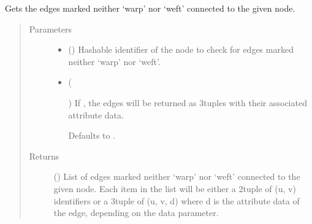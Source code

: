 \documentclass[letterpaper,10pt,english]{sphinxmanual}
\begin{document}
\begin{fulllineitems}
\begin{fulllineitems}
\label{\detokenize{cockatoo:cockatoo.KnitNetworkBase.node_contour_edges}}
Gets the edges marked neither ‘warp’ nor ‘weft’ connected to the
given node.
\begin{quote}\begin{description}
\item[{Parameters}] \leavevmode\begin{itemize}
\item {} 
 () \textendash{} Hashable identifier of the node to check for edges marked neither
‘warp’ nor ‘weft’.

\item {} 
 (%
\begin{footnote}[90]\sphinxAtStartFootnote
{}
%
\end{footnote}\sphinxstyleliteralemphasis{\sphinxupquote{, }}) \textendash{} 
If , the edges will be returned as 3\sphinxhyphen{}tuples with their
associated attribute data.

Defaults to .


\end{itemize}

\item[{Returns}] \leavevmode
{} () \textendash{} List of edges marked neither ‘warp’ nor ‘weft’ connected to the
given node. Each item in the list will be either a 2\sphinxhyphen{}tuple of
(u, v) identifiers or a 3\sphinxhyphen{}tuple of (u, v, d) where d is the
attribute data of the edge, depending on the data parameter.

\end{description}\end{quote}

\end{fulllineitems}



\end{fulllineitems}
\end{document}
